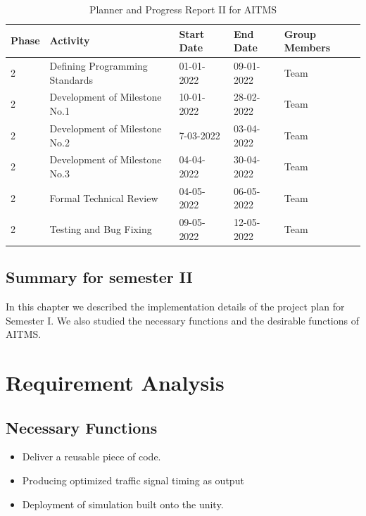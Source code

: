 \documentclass[openany,12pt]{report}
\begin{document}
		\begin{table} [htb]
			\begin{tabular}{| p{1.2 cm}| p{5 cm}| p{2.5 cm}| p{2.5 cm}| p{3 cm}| }\hline
				\textbf{Phase}	&\textbf{Activity}	&\textbf{Start Date}	&\textbf{End Date} &\textbf{Group Members}\\\hline\hline

				2 &Defining Programming Standards	
				&01-01-2022 	
				&09-01-2022 &Team \\\hline

				2 &Development of Milestone No.1 
				&10-01-2022 
				&28-02-2022 &Team\\\hline

				2 &Development of Milestone No.2 
				&7-03-2022 
				&03-04-2022 &Team\\\hline

				2 &Development of Milestone No.3 
				&04-04-2022 
				&30-04-2022 & Team \\\hline

				2 &Formal Technical Review 
				&04-05-2022 
				&06-05-2022 &Team \\\hline

				2 &Testing and Bug Fixing  
				&09-05-2022 
				&12-05-2022 &Team\\\hline
				
			\end{tabular}
			\caption{Planner and Progress Report II for AITMS}
			\label{tab:nnwork}
		\end{table}
	
	
	\subsection{Summary for semester II}
	\hspace*{0.5 in}In this chapter we described the implementation details of the project plan for
Semester I. We also studied the necessary functions and the desirable functions of AITMS.

	\newpage

	
	
	\section{Requirement Analysis}
	
	\subsection{Necessary Functions}
	\begin{itemize}
		\item{Deliver a reusable piece of code.}
		\item{Producing optimized traffic signal timing as output}
		\item{Deployment of simulation built onto the unity.}
	\end{itemize}
	
\end{document}
